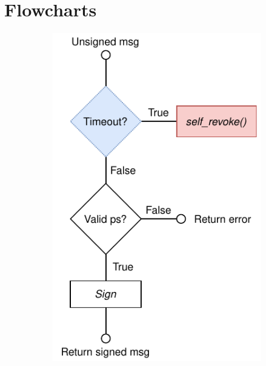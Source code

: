 \section{Flowcharts}
\label{appendix:flowcharts}

%

\begin{figure}
    \begin{subfigure}[T]{.4\columnwidth}
        \includegraphics[width=\columnwidth]{figures/drawio/flowchart-sign.drawio.pdf}

\end{subfigure}
\end{figure}
